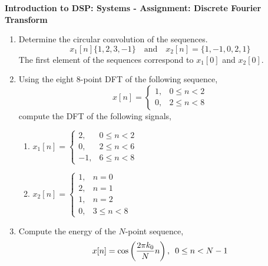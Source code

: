 \documentclass[9pt]{article}
\def\lp{\ensuremath\left(}
\def\rp{\ensuremath\right)}
\begin{document}
\begin{center}
    \begin{Large}
        \textbf{Introduction to DSP: Systems - Assignment: Discrete Fourier Transform}
    \end{Large}
\end{center}
\vspace{0.2cm}

\begin{multicols}{2}
    \begin{enumerate}
        \item Determine the circular convolution of the sequences.
        \[ x_1[n] \{1, 2, 3, -1 \} \quad \text{and} \quad x_2[n] = \{ 1, -1, 0, 2, 1 \} \]
        The first element of the sequences correspond to $x_1[0]$ and $x_2[0]$.
        
        \item Using the eight 8-point DFT of the following sequence,
        \[ x[n] = \begin{cases} 1, & 0 \leq n < 2 \\ 0, & 2 \leq n < 8\end{cases} \]
        compute the DFT of the following signals,
        \begin{enumerate}
            \item $x_1[n] = \begin{cases} 2, & 0 \leq n < 2 \\ 0, & 2 \leq n < 6 \\ -1, & 6 \leq n < 8 \end{cases}$
            \item $x_2[n] = \begin{cases} 1, & n = 0 \\ 2, & n = 1\\ 1, & n = 2 \\ 0, & 3 \leq n < 8 \end{cases}$
        \end{enumerate}

        \item Compute the energy of the $N$-point sequence,
        \[ x[n] = \cos \lp \frac{2\pi k_0}{N}n\rp, \,\,\, 0 \leq n < N-1 \]
    \end{enumerate}
    \vfill
\end{multicols}
\end{document}

